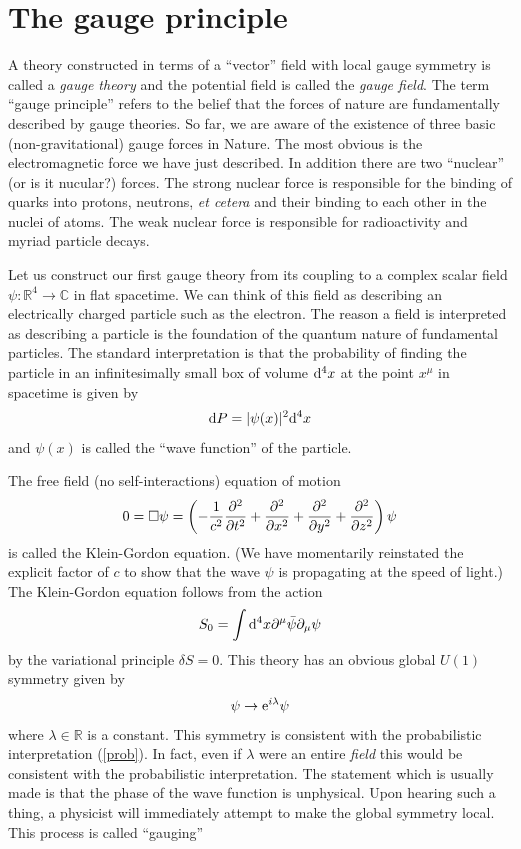 \documentclass[12pt]{article}
\begin{document}
\section{The gauge principle}
\label{GaugePrinciple}

A theory constructed in terms of a ``vector'' field with local gauge symmetry is called a {\em gauge theory} and the potential field is called the {\em gauge field}. The term ``gauge principle'' refers to the belief that the forces of nature are fundamentally described by gauge theories. So far, we are aware of the existence of three basic (non-gravitational) gauge forces in Nature. The most obvious is the electromagnetic force we have just described. In addition there are two ``nuclear'' (or is it nucular?) forces. The strong nuclear force is responsible for the binding of quarks into protons, neutrons, {\it et cetera} and their binding to each other in the nuclei of atoms. The weak nuclear force is responsible for radioactivity and myriad particle decays.  

Let us construct our first gauge theory from its coupling to a complex scalar field $\psi : {\mathbb R}^4\to {\mathbb C}$ in flat spacetime. We can think of this field as describing an electrically charged particle such as the electron. The reason a field is interpreted as describing a particle is the foundation of the quantum nature of fundamental particles. The standard interpretation is that the probability of finding the particle in an infinitesimally small box of volume ${\rm d}^4 x$ at the point $x^\mu$ in spacetime is given by 
\begin{eqnarray}
\label{prob}
{\rm d}P=|\psi(x)|^2 {\rm d}^4 x
\end{eqnarray}
and $\psi (x)$ is called the ``wave function'' of the particle.

The free field (no self-interactions) equation of motion 
\begin{eqnarray}
0=\Box \psi =\left( -{1\over c^2} {\partial^2 \over \partial t^2}+{\partial^2 \over \partial x^2}+{\partial^2 \over \partial y^2}+{\partial^2 \over \partial z^2}\right) \psi
\end{eqnarray}
is called the Klein-Gordon equation. (We have momentarily reinstated the explicit factor of $c$ to show that the wave $\psi$ is propagating at the speed of light.) The Klein-Gordon equation follows from the action 
\begin{eqnarray}
S_0=\int {\rm d}^4x \partial^\mu \bar \psi \partial_\mu \psi
\end{eqnarray}
by the variational principle $\delta S=0$. This theory has an obvious global $U(1)$ symmetry given by 
\begin{eqnarray}
\label{u1}
\psi\to {\rm e}^{i \lambda} \psi
\end{eqnarray}
where $\lambda \in {\mathbb R}$ is a constant. This symmetry is consistent with the probabilistic interpretation (\ref{prob}). In fact, even if $\lambda$ were an entire {\em field} this would be consistent with the probabilistic interpretation. The statement which is usually made is that the phase of the wave function is unphysical. Upon hearing such a thing, a physicist will immediately attempt to make the global symmetry local. This process is called ``gauging''
\end{document}
